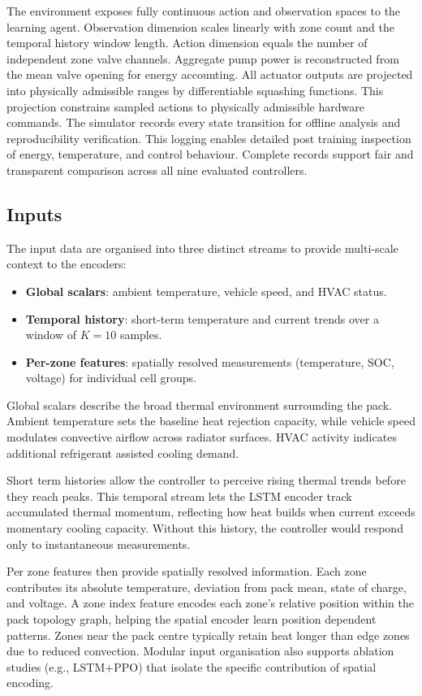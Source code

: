 \documentclass[twocolumn]{article}
\begin{document}
The environment exposes fully continuous action and observation spaces to the learning agent. Observation dimension scales linearly with zone count and the temporal history window length. Action dimension equals the number of independent zone valve channels. Aggregate pump power is reconstructed from the mean valve opening for energy accounting. All actuator outputs are projected into physically admissible ranges by differentiable squashing functions. This projection constrains sampled actions to physically admissible hardware commands. The simulator records every state transition for offline analysis and reproducibility verification. This logging enables detailed post training inspection of energy, temperature, and control behaviour. Complete records support fair and transparent comparison across all nine evaluated controllers.

\subsection*{Inputs}

The input data are organised into three distinct streams to provide multi-scale context to the encoders:
\begin{itemize}
    \item \textbf{Global scalars}: ambient temperature, vehicle speed, and HVAC status.
    \item \textbf{Temporal history}: short-term temperature and current trends over a window of $K=10$ samples.
    \item \textbf{Per-zone features}: spatially resolved measurements (temperature, SOC, voltage) for individual cell groups.
\end{itemize}

Global scalars describe the broad thermal environment surrounding the pack. Ambient temperature sets the baseline heat rejection capacity, while vehicle speed modulates convective airflow across radiator surfaces. HVAC activity indicates additional refrigerant assisted cooling demand.

Short term histories allow the controller to perceive rising thermal trends before they reach peaks. This temporal stream lets the LSTM encoder track accumulated thermal momentum, reflecting how heat builds when current exceeds momentary cooling capacity. Without this history, the controller would respond only to instantaneous measurements.

Per zone features then provide spatially resolved information. Each zone contributes its absolute temperature, deviation from pack mean, state of charge, and voltage. A zone index feature encodes each zone's relative position within the pack topology graph, helping the spatial encoder learn position dependent patterns. Zones near the pack centre typically retain heat longer than edge zones due to reduced convection. Modular input organisation also supports ablation studies (e.g., LSTM+PPO) that isolate the specific contribution of spatial encoding.
\end{document}
